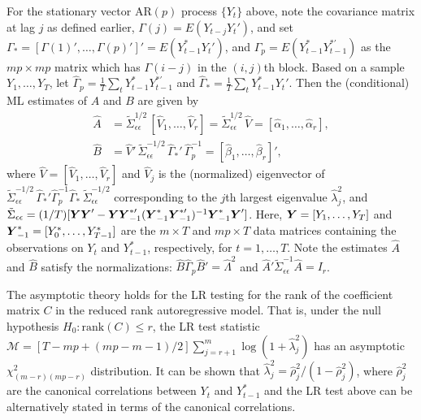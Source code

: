 For the stationary vector AR$(p)$ process $\{ Y_t \}$ above, note the covariance matrix at lag $j$ as defined earlier, $\Gamma(j) = E (Y_{t-j} Y_t' )$, and set $\Gamma_* = [\Gamma (1)', \ldots, \Gamma (p)' ]' = E(Y_{t-1}^* Y_t')$, and $\Gamma_p = E(Y_{t-1}^* Y_{t-1}^{*\prime})$ as the $mp \times mp$ matrix which has $\Gamma(i-j)$ in the $(i,j)$th block. Based on a sample $Y_1, \ldots, Y_T$, let $\hat{\Gamma}_p= \frac{1}{T} \sum_t Y_{t-1}^* Y_{t-1}^{*\prime}$ and $\hat{\Gamma}_* = \frac{1}{T} \sum_t Y_{t-1}^* Y_t'$. Then the (conditional) ML estimates of $A$ and $B$ are given by
	\begin{equation} \label{eqn:2AhatBhat}
	\begin{split}
	\hat{A}&= \tilde{\Sigma}_{\epsilon\epsilon}^{1/2} \, [\hat{V}_{1}, \ldots, \hat{V}_{r}] =  \tilde{\Sigma}_{\epsilon\epsilon}^{1/2}\, \hat{V} = [\hat{\alpha}_1, \ldots, \hat{\alpha}_r ], \\
	\hat{B}&= \hat{V}' \, \tilde{\Sigma}_{\epsilon\epsilon}^{-1/2}\, \hat{\Gamma}_* ' \,\hat{\Gamma}_p^{-1} = [\hat{\beta}_1, \ldots, \hat{\beta}_r]' ,
	\end{split}
	\end{equation}
where $\hat{V} = [\hat{V}_1, \ldots, \hat{V}_r]$ and $\hat{V}_j$ is the (normalized) eigenvector of $\tilde{\Sigma}_{\epsilon\epsilon}^{-1/2}\, \hat{\Gamma}_* ' \hat{\Gamma}_p^{-1} \hat{\Gamma}_* \, \tilde{\Sigma}_{\epsilon\epsilon}^{-1/2}$ corresponding to the $j$th largest eigenvalue $\hat{\lambda}_j^2$, and $\tilde{\Sigma}_{\epsilon\epsilon} = (1/T) [\mbox{\boldmath{$Y$}} \mbox{\boldmath{$Y$}}' - \mbox{\boldmath{$Y$}} \mbox{\boldmath{$Y$}}_{-1}^{*\prime} (\mbox{\boldmath{$Y$}}_{-1}^* \mbox{\boldmath{$Y$}}_{-1}^{*\prime} )^{-1} \mbox{\boldmath{$Y$}}_{-1}^* \mbox{\boldmath{$Y$}}' ]$.  Here, $\mbox{\boldmath{$Y$}} = [Y_1, \ldots, Y_T]$ and $\mbox{\boldmath{$Y$}}_{-1}^* = [Y_0^*, \ldots, Y_{T-1}^*]$ are the $m \times T$ and $mp \times T$ data matrices containing the observations on $Y_t$ and $Y_{t-1}^*$, respectively, for $t = 1,\ldots, T$. Note the estimates $\hat{A}$ and $\hat{B}$ satisfy the normalizations: $\hat{B} \hat{\Gamma}_p \hat{B}'= \hat{\Lambda}^2$ and $\hat{A}' \tilde{\Sigma}_{\epsilon\epsilon}^{-1} \hat{A}= I_r$. 


The asymptotic theory holds for the LR testing for the rank of the coefficient matrix $C$ in the reduced rank autoregressive  model. That is, under the null hypothesis $H_0: \text{rank}(C) \leq r$, the LR test statistic ${\mathcal{M}} = [T - mp + (mp - m - 1)/2] \sum_{j= r + 1}^{m} \log(1 + \hat{\lambda}_{j}^{2} )$ has an asymptotic $\chi_{(m-r)(mp-r)}^{2}$ distribution. It can be shown that $\hat{\lambda}_j^2= \hat{\rho}_j^2/(1 - \hat{\rho}_j^2)$, where $\hat{\rho}_j^2$ are the canonical correlations between $Y_t$ and $Y_{t-1}^*$ and the LR test above can be alternatively stated in terms of the canonical correlations.


